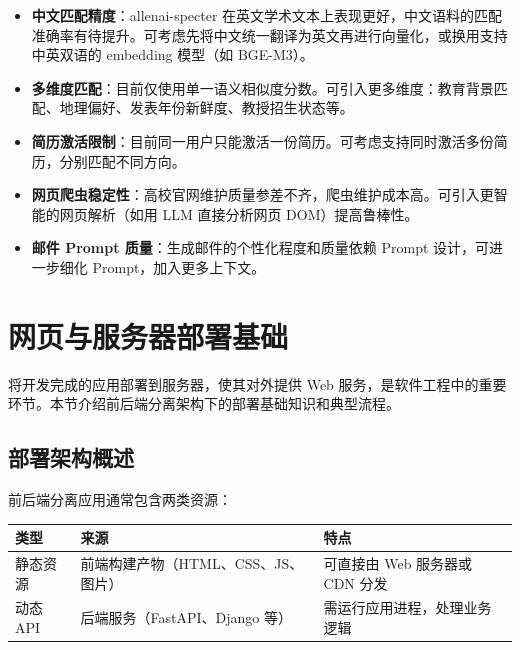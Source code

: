 \documentclass[11pt]{article}
\begin{document}
\begin{itemize}
    \item \textbf{中文匹配精度}：allenai-specter 在英文学术文本上表现更好，中文语料的匹配准确率有待提升。可考虑先将中文统一翻译为英文再进行向量化，或换用支持中英双语的 embedding 模型（如 BGE-M3）。

    \item \textbf{多维度匹配}：目前仅使用单一语义相似度分数。可引入更多维度：教育背景匹配、地理偏好、发表年份新鲜度、教授招生状态等。

    \item \textbf{简历激活限制}：目前同一用户只能激活一份简历。可考虑支持同时激活多份简历，分别匹配不同方向。

    \item \textbf{网页爬虫稳定性}：高校官网维护质量参差不齐，爬虫维护成本高。可引入更智能的网页解析（如用 LLM 直接分析网页 DOM）提高鲁棒性。

    \item \textbf{邮件 Prompt 质量}：生成邮件的个性化程度和质量依赖 Prompt 设计，可进一步细化 Prompt，加入更多上下文。
\end{itemize}

\section{网页与服务器部署基础}

将开发完成的应用部署到服务器，使其对外提供 Web 服务，是软件工程中的重要环节。本节介绍前后端分离架构下的部署基础知识和典型流程。

\subsection{部署架构概述}

前后端分离应用通常包含两类资源：

\begin{center}
\begin{tabular}{|l|l|l|}
\hline
\textbf{类型} & \textbf{来源} & \textbf{特点} \\
\hline
静态资源 & 前端构建产物（HTML、CSS、JS、图片） & 可直接由 Web 服务器或 CDN 分发 \\
\hline
动态 API & 后端服务（FastAPI、Django 等） & 需运行应用进程，处理业务逻辑 \\
\hline
\end{tabular}
\end{center}
\end{document}
